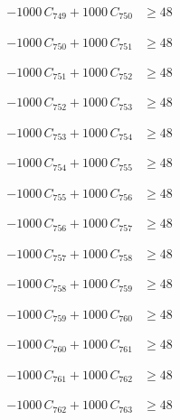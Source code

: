 \documentclass[a4paper,11pt]{article}
\begin{document}
\begin{align}
-1000\,C_{749} + 1000\,C_{750} &\geq 48 \nonumber
\end{align}

\begin{align}
-1000\,C_{750} + 1000\,C_{751} &\geq 48 \nonumber
\end{align}

\begin{align}
-1000\,C_{751} + 1000\,C_{752} &\geq 48 \nonumber
\end{align}

\begin{align}
-1000\,C_{752} + 1000\,C_{753} &\geq 48 \nonumber
\end{align}

\begin{align}
-1000\,C_{753} + 1000\,C_{754} &\geq 48 \nonumber
\end{align}

\begin{align}
-1000\,C_{754} + 1000\,C_{755} &\geq 48 \nonumber
\end{align}

\begin{align}
-1000\,C_{755} + 1000\,C_{756} &\geq 48 \nonumber
\end{align}

\begin{align}
-1000\,C_{756} + 1000\,C_{757} &\geq 48 \nonumber
\end{align}

\begin{align}
-1000\,C_{757} + 1000\,C_{758} &\geq 48 \nonumber
\end{align}

\begin{align}
-1000\,C_{758} + 1000\,C_{759} &\geq 48 \nonumber
\end{align}

\begin{align}
-1000\,C_{759} + 1000\,C_{760} &\geq 48 \nonumber
\end{align}

\begin{align}
-1000\,C_{760} + 1000\,C_{761} &\geq 48 \nonumber
\end{align}

\begin{align}
-1000\,C_{761} + 1000\,C_{762} &\geq 48 \nonumber
\end{align}

\begin{align}
-1000\,C_{762} + 1000\,C_{763} &\geq 48 \nonumber
\end{align}
\end{document}
